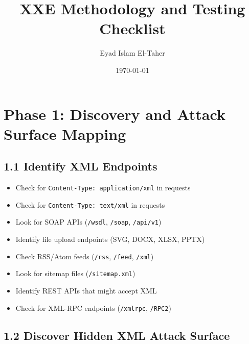 \documentclass{article}
\title{XXE Methodology and Testing Checklist}
\author{Eyad Islam El-Taher}
\date{\today}
\begin{document}
\maketitle


\section{Phase 1: Discovery and Attack Surface Mapping}

\subsection{1.1 Identify XML Endpoints}

\begin{checklistbox}
\begin{itemize}
    \item  Check for \texttt{Content-Type: application/xml} in requests
    \item  Check for \texttt{Content-Type: text/xml} in requests
    \item  Look for SOAP APIs (\texttt{/wsdl}, \texttt{/soap}, \texttt{/api/v1})
    \item  Identify file upload endpoints (SVG, DOCX, XLSX, PPTX)
    \item  Check RSS/Atom feeds (\texttt{/rss}, \texttt{/feed}, \texttt{/xml})
    \item  Look for sitemap files (\texttt{/sitemap.xml})
    \item  Identify REST APIs that might accept XML
    \item  Check for XML-RPC endpoints (\texttt{/xmlrpc}, \texttt{/RPC2})
\end{itemize}
\end{checklistbox}

\subsection{1.2 Discover Hidden XML Attack Surface}
\end{document}
